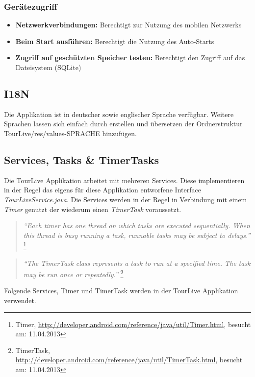 \subsubsection{Gerätezugriff}
\begin{itemize} [noitemsep,topsep=0pt]
	\item \textbf{Netzwerkverbindungen:} Berechtigt zur Nutzung des mobilen Netzwerks
	\item \textbf{Beim Start ausführen:} Berechtigt die Nutzung des Auto-Starts
	\item \textbf{Zugriff auf geschützten Speicher testen:} Berechtigt den Zugriff auf das Dateisystem (SQLite)
\end{itemize}

\subsection{I18N}
Die Applikation ist in deutscher sowie englischer Sprache verfügbar. Weitere Sprachen lassen sich einfach durch erstellen  und übersetzen der Ordnerstruktur TourLive/res/values-SPRACHE hinzufügen.

\subsection{Services, Tasks \& TimerTasks}
Die TourLive Applikation arbeitet mit mehreren Services. Diese implementieren in der Regel das eigens für diese Applikation entworfene Interface \textit{TourLiveService.java}. Die Services werden in der Regel in Verbindung mit einem \textit{Timer} genutzt der wiederum einen \textit{TimerTask} voraussetzt.

\begin{quotation}
\textit{``Each timer has one thread on which tasks are executed sequentially. When this thread is busy running a task, runnable tasks may be subject to delays.''} \footnote{Timer, \url{http://developer.android.com/reference/java/util/Timer.html}, besucht am: 11.04.2013}
\end{quotation}

\begin{quotation}
\textit{``The TimerTask class represents a task to run at a specified time. The task may be run once or repeatedly.''} \footnote{TimerTask, \url{http://developer.android.com/reference/java/util/TimerTask.html}, besucht am: 11.04.2013}
\end{quotation}

Folgende Services, Timer und TimerTask werden in der TourLive Applikation verwendet.
